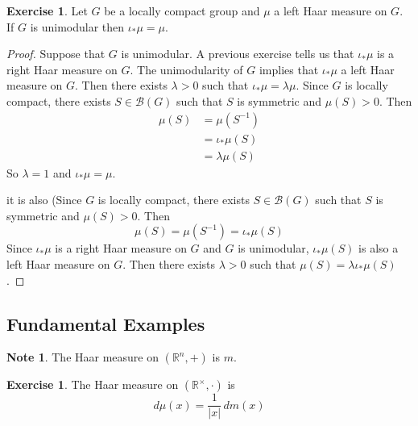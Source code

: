 \documentclass[12pt]{amsart}
\theoremstyle{definition}
\newtheorem{note}[definition]{Note}
\newtheorem{ex}[definition]{Exercise}
\newcommand{\lam}{\lambda}
\newcommand{\R}{\mathbb{R}}
\newcommand{\MB}{\mathcal{B}}
\newcommand{\dm}{\, d m}
\newcommand{\lex}[1]{\label{ex:#1}}
\begin{document}
	\begin{ex} \lex{00000} 
		Let $G$ be a locally compact group and $\mu$ a left Haar measure on $G$. If $G$ is unimodular then $\iota_*\mu = \mu$.
	\end{ex}

	\begin{proof}
		Suppose that $G$ is unimodular. A previous exercise tells us that $\iota_*\mu$ is a right Haar measure on $G$. The unimodularity of $G$ implies that $\iota_*\mu$ a left Haar measure on $G$. Then there exists $\lam >0$ such that $\iota_*\mu = \lam \mu$. Since $G$ is locally compact, there exists $S \in \MB(G)$ such that $S$ is symmetric and $\mu(S) > 0$. Then 
		\begin{align*}
			\mu(S) 
			& = \mu(S^{-1}) \\
			& = \iota_*\mu(S) \\
			& = \lam \mu(S) 
		\end{align*}	
		So $\lam = 1$ and $\iota_*\mu = \mu$.

		it is also (Since $G$ is locally compact, there exists $S \in \MB(G)$ such that $S$ is symmetric and $\mu(S) > 0$. Then 
		$$\mu(S) = \mu(S^{-1}) = \iota_*\mu(S)$$ Since $\iota_*\mu$ is a right Haar measure on $G$ and $G$ is unimodular, $\iota_*\mu(S)$ is also a left Haar measure on $G$. Then there exists $\lam > 0$ such that $\mu(S) = \lam\iota_*\mu(S)$.
	\end{proof}




	
	



	
	
	
	
	
	
	
	\newpage
	\subsection{Fundamental Examples}		
	
	\begin{note}
		The Haar measure on  $(\R^n, +)$ is $m$.
	\end{note}
	
	\begin{ex} \lex{00000} 
		The Haar measure on $(\R^{\times}, \cdot)$  is $$d\mu(x) = \frac{1}{|x|} \dm(x)$$
	\end{ex}
\end{document}
